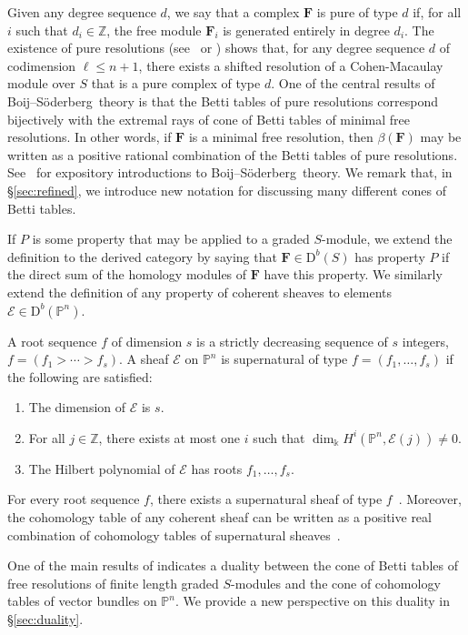 \documentclass[12pt]{amsart}
\theoremstyle{definition}
\theoremstyle{remark}
\newcommand{\PP}{\mathbb{P}}
\newcommand{\ZZ}{\mathbb{Z}}
\newcommand{\dd}{d}
\newcommand{\cE}{\mathcal{E}}
\newcommand{\FF}{\mathbf{F}}
\newcommand{\defi}[1]{\textsf{#1}} %
\newcommand{\DD}{\mathrm{D}}
\def\BS{Boij--S\"oderberg~}
\begin{document}
Given any degree sequence $\dd$, we say that a complex $\FF$ is \defi{pure of type $\dd$} if, for all $i$ such that $d_i\in \ZZ$, the free module $\FF_i$ is generated entirely in degree $d_i$.   The existence of pure resolutions (see~\cite{efw} or \cite[\S5]{eis-schrey1}) shows that, for any  degree sequence $\dd$ of codimension $\ell\leq n+1$, there exists a shifted resolution of a Cohen-Macaulay module over $S$ that is a pure complex of type $\dd$.  One of the central results of \BS theory is that the Betti tables of pure resolutions correspond bijectively with the extremal rays of cone of Betti tables of minimal free resolutions.  In other words, if $\FF$ is a minimal free resolution, then $\beta(\FF)$ may be written as a positive rational combination of the Betti tables of pure resolutions.  See~\cites{eis-schrey-icm,floystad-expository} for expository introductions to \BS theory.  We remark that, in \S\ref{sec:refined}, we introduce new notation for discussing many different cones of Betti tables.


If $P$ is some property that may be applied to a graded $S$-module, we extend the definition to the derived category by saying that $\FF \in \DD^b(S)$ has property $P$ if the direct sum of the homology modules of $\FF$ have this property. We similarly extend the definition of any property of coherent sheaves to elements $\cE\in \DD^b(\PP^n)$.  

A \defi{root sequence $f$ of dimension $s$} is a strictly decreasing sequence
of $s$ integers, $f=(f_1>\cdots>f_s)$.  
A sheaf $\cE$ on $\PP^{n}$ is
\defi{supernatural of type} $f=(f_1, \dots, f_{s})$ if the following are satisfied: 
\begin{enumerate}
\item The dimension of $\cE$ is $s$.
\item For all $j\in \mathbb Z$, there exists at most one $i$ 
		such that $\dim_\Bbbk H^i(\PP^{n}, \cE(j))\ne 0$.
\item The Hilbert polynomial of $\cE$ has roots $f_1, \dots, f_{s}$.
\end{enumerate}
For every root sequence $f$, there exists a supernatural sheaf of type
$f$~\cite[Theorem~0.4]{eis-schrey1}.
Moreover, the cohomology table of any coherent sheaf 
can be written as a positive real combination of cohomology tables 
of supernatural sheaves~\cite[Theorem~0.1]{eis-schrey1}.  

One of the main results of \cite{eis-schrey1} indicates a duality between the cone of Betti tables of free resolutions of finite length graded $S$-modules and the cone of cohomology tables of vector bundles on $\PP^n$.  We provide a new perspective on this duality in \S\ref{sec:duality}. 
\end{document}
